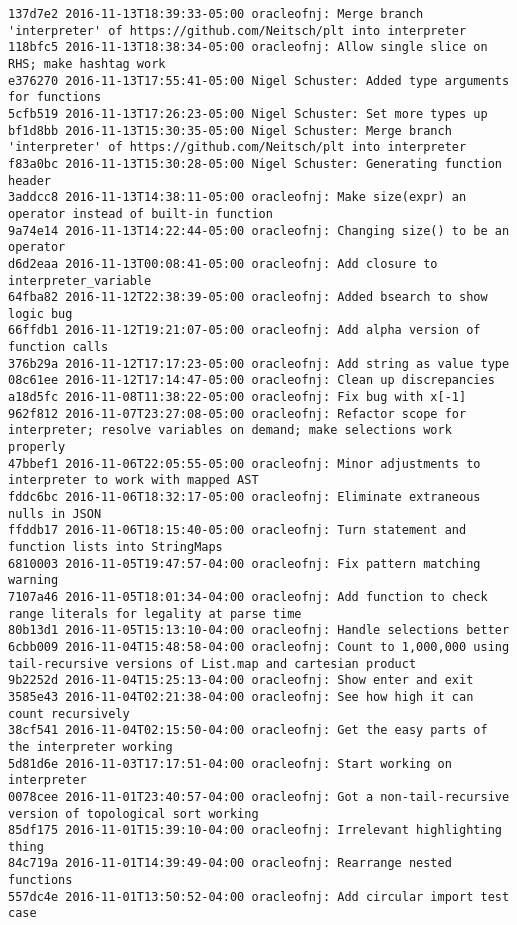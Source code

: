 \begin{lstlisting}
137d7e2 2016-11-13T18:39:33-05:00 oracleofnj: Merge branch 'interpreter' of https://github.com/Neitsch/plt into interpreter
118bfc5 2016-11-13T18:38:34-05:00 oracleofnj: Allow single slice on RHS; make hashtag work
e376270 2016-11-13T17:55:41-05:00 Nigel Schuster: Added type arguments for functions
5cfb519 2016-11-13T17:26:23-05:00 Nigel Schuster: Set more types up
bf1d8bb 2016-11-13T15:30:35-05:00 Nigel Schuster: Merge branch 'interpreter' of https://github.com/Neitsch/plt into interpreter
f83a0bc 2016-11-13T15:30:28-05:00 Nigel Schuster: Generating function header
3addcc8 2016-11-13T14:38:11-05:00 oracleofnj: Make size(expr) an operator instead of built-in function
9a74e14 2016-11-13T14:22:44-05:00 oracleofnj: Changing size() to be an operator
d6d2eaa 2016-11-13T00:08:41-05:00 oracleofnj: Add closure to interpreter_variable
64fba82 2016-11-12T22:38:39-05:00 oracleofnj: Added bsearch to show logic bug
66ffdb1 2016-11-12T19:21:07-05:00 oracleofnj: Add alpha version of function calls
376b29a 2016-11-12T17:17:23-05:00 oracleofnj: Add string as value type
08c61ee 2016-11-12T17:14:47-05:00 oracleofnj: Clean up discrepancies
a18d5fc 2016-11-08T11:38:22-05:00 oracleofnj: Fix bug with x[-1]
962f812 2016-11-07T23:27:08-05:00 oracleofnj: Refactor scope for interpreter; resolve variables on demand; make selections work properly
47bbef1 2016-11-06T22:05:55-05:00 oracleofnj: Minor adjustments to interpreter to work with mapped AST
fddc6bc 2016-11-06T18:32:17-05:00 oracleofnj: Eliminate extraneous nulls in JSON
ffddb17 2016-11-06T18:15:40-05:00 oracleofnj: Turn statement and function lists into StringMaps
6810003 2016-11-05T19:47:57-04:00 oracleofnj: Fix pattern matching warning
7107a46 2016-11-05T18:01:34-04:00 oracleofnj: Add function to check range literals for legality at parse time
80b13d1 2016-11-05T15:13:10-04:00 oracleofnj: Handle selections better
6cbb009 2016-11-04T15:48:58-04:00 oracleofnj: Count to 1,000,000 using tail-recursive versions of List.map and cartesian product
9b2252d 2016-11-04T15:25:13-04:00 oracleofnj: Show enter and exit
3585e43 2016-11-04T02:21:38-04:00 oracleofnj: See how high it can count recursively
38cf541 2016-11-04T02:15:50-04:00 oracleofnj: Get the easy parts of the interpreter working
5d81d6e 2016-11-03T17:17:51-04:00 oracleofnj: Start working on interpreter
0078cee 2016-11-01T23:40:57-04:00 oracleofnj: Got a non-tail-recursive version of topological sort working
85df175 2016-11-01T15:39:10-04:00 oracleofnj: Irrelevant highlighting thing
84c719a 2016-11-01T14:39:49-04:00 oracleofnj: Rearrange nested functions
557dc4e 2016-11-01T13:50:52-04:00 oracleofnj: Add circular import test case

\end{lstlisting}
